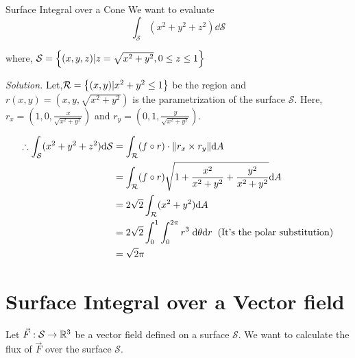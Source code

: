 \documentclass[../Analysis-3.tex]{subfiles}
\begin{document}
\begin{Eg}{Surface Integral over a Cone}{}
  We want to evaluate \[ \int_{\mathcal{S}}(x^2+y^2+z^2) \dd \mathcal{S}\]

  where, $\mathcal{S} = \qty{(x,y,z) | z = \sqrt{x^2 + y^2},0 \le z \le 1}$

  \textit{Solution.} Let,$\mathcal{R} = \qty{(x,y)| x^2+y^2 \le 1}$ be the region and $r(x,y) = \left( x,y,\sqrt{x^2+y^2} \right)$ is the parametrization of the surface $\mathcal{S}$. Here, $r_x = \left( 1,0, \frac{x}{\sqrt{x^2+y^2}} \right)$ and $r_y = \left( 0,1,\frac{y}{\sqrt{x^2+y^2}} \right)$.


  \begin{align*}
    \therefore \int_{\mathcal{S}}(x^2+y^2+z^2) \dd \mathcal{S}
     & = \int_{\mathcal{R}} (f\circ r) \cdot \norm{r_x \times r_y} \dd A                                                                \\
     & = \int_{\mathcal{R}} (f\circ r) \sqrt{1 + \frac{x^2}{x^2+y^2} + \frac{y^2}{x^2+y^2}} \dd A                                       \\
     & = 2\sqrt{2} \int_{\mathcal{R}} (x^2+y^2) \dd A                                                                                   \\
     & = 2\sqrt{2} \int_{0}^{1} \int_{0}^{2\pi} r^3 \hspace{0.1cm} \dd \theta \dd r \hspace{0.2cm} (\text{It's the polar substitution}) \\
     & = \sqrt{2} \pi
  \end{align*}

\end{Eg}

\section{Surface Integral over a Vector field}

Let $\vec{F} : \mathcal{S} \to \mathbb{R}^3$ be a vector field defined on a surface $\mathcal{S}$. We want to calculate the flux of $\vec{F}$ over the surface $\mathcal{S}$.
\end{document}
